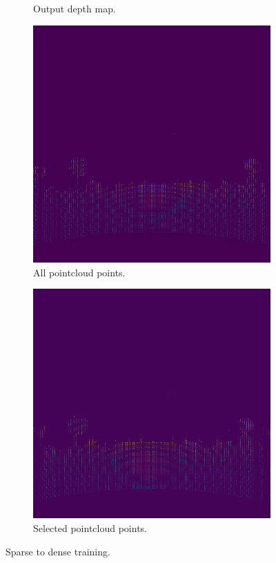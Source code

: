 \documentclass[twoside]{ctuthesis}
\theoremstyle{plain}
\theoremstyle{definition}
\theoremstyle{note}
\begin{document}
\begin{figure}
\begin{subfigure}[b]{0.4\textwidth}
		\caption{Output depth map.}
	\end{subfigure}
	\hfill
	\begin{subfigure}[b]{0.4\textwidth}
		\centering
		\includegraphics[width=\textwidth]{s2d_all.png}
		\caption{All pointcloud points.}
	\end{subfigure}
	\hfill
	\begin{subfigure}[b]{0.4\textwidth}
		\centering
		\includegraphics[width=\textwidth]{s2d_select.png}
		\caption{Selected pointcloud points.}
	\end{subfigure}
	\caption{Sparse to dense training.}
\end{figure}
\end{document}
